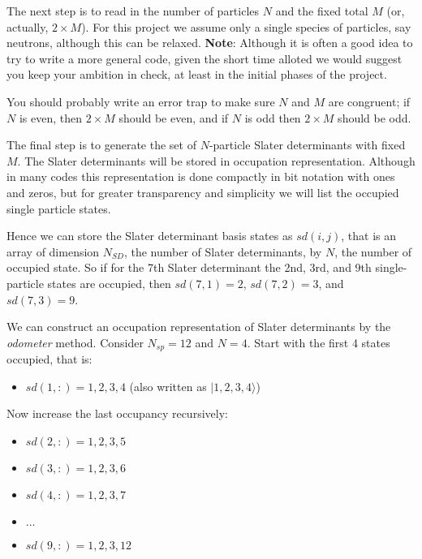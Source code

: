 \documentclass[graybox,sectrefs,envcountresetchap,open=right]{svmonodo}
\begin{document}
\noindent
The next step is to read in the number of particles $N$ and the fixed total $M$ (or, actually, $2 \times M$). 
For this project we assume only a single species of particles, say neutrons, although this can be 
relaxed. \textbf{Note}: Although it is often a good idea to try to write a more general code, given the 
short time alloted we would suggest you keep your ambition in check, at least in the initial phases of the 
project.  


You should probably write an error trap to make sure $N$ and $M$ are congruent; if $N$ is even, then 
$2 \times M$ should be even, and if $N$ is odd then $2\times M$ should be odd. 


The final step is to generate the set of $N$-particle Slater determinants with fixed $M$. 
The Slater determinants will be stored in occupation representation.  Although in many codes
this representation is done compactly in bit notation with ones and zeros, but for 
greater transparency and simplicity we will list the occupied single particle states.

 Hence we can 
store the Slater determinant basis states as $sd(i,j)$, that is an 
array of dimension $N_{SD}$, the number of Slater determinants, by $N$, the number of occupied 
state. So if for the 7th Slater determinant the 2nd, 3rd, and 9th single-particle states are occupied, 
then $sd(7,1) = 2$, $sd(7,2) = 3$, and $sd(7,3) = 9$.


We can construct an occupation representation of Slater determinants by the \emph{odometer}
method.  Consider $N_{sp} = 12$ and $N=4$. 
Start with the first 4 states occupied, that is:

\begin{itemize}
\item $sd(1,:)= 1,2,3,4$ (also written as $|1,2,3,4 \rangle$)
\end{itemize}

\noindent
Now increase the last occupancy recursively:
\begin{itemize}
\item $sd(2,:)= 1,2,3,5$

\item $sd(3,:)= 1,2,3,6$

\item $sd(4,:)= 1,2,3,7$

\item $\ldots$

\item $sd(9,:)= 1,2,3,12$
\end{itemize}
\end{document}

